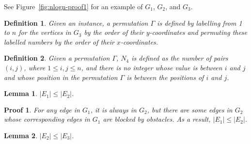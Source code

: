 \documentclass[]{article}
\newtheorem{Definition}{Definition}
\newtheorem{Lemma}{Lemma}
\newtheorem{Proof}{Proof}
\begin{document}
\begin{qunlist}
{{%

See Figure~\ref{fig:nlogn-proof1} for an example of $G_1$, $G_2$, and $G_3$.

\begin{Definition}\label{def:gamma}
Given an instance, a permutation $\Gamma$ is defined by labelling from 1 to $n$ for the vertices in $G_3$ by the order of their $y$-coordinates and permuting these labelled numbers by the order of their $x$-coordinates.
\end{Definition}

\begin{Definition}\label{def:n4}
Given a permutation $\Gamma$, $N_4$ is defined as the number of pairs $(i,j)$, where $1\leq i,j\leq n$, and there is no integer whose value is between $i$ and $j$ and whose position in the permutation $\Gamma$ is between the positions of $i$ and $j$.
\end{Definition}



\begin{Lemma}\label{lemma:e1-e2}
$|E_1|\leq |E_2|$.
\end{Lemma}

\begin{Proof}
For any edge in $G_1$, it is always in $G_2$, but there are some edges in $G_2$ whose corresponding edges in $G_1$ are blocked by obstacles. As a result, $|E_1|\leq |E_2|$.
\end{Proof}

\begin{Lemma}\label{lemma:e2-e3}
$|E_2|\leq |E_3|$.
\end{Lemma}

}}
\end{qunlist}
\end{document}
